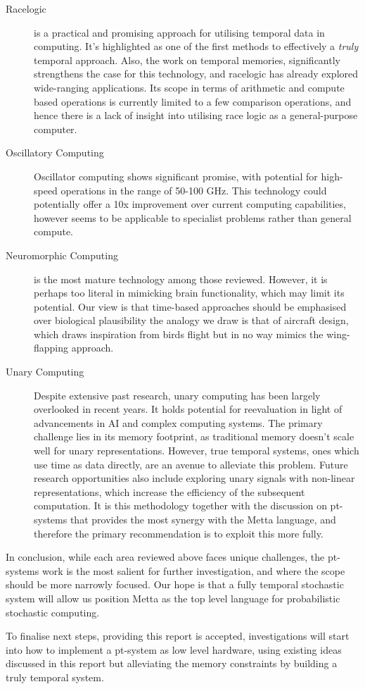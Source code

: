 \documentclass{article}
\begin{document}
\begin{description}

	\item[Racelogic] is a practical and promising approach for utilising temporal data in computing. It's highlighted as one of the first methods to effectively a \textit{truly} temporal approach. Also, the work on temporal memories, significantly strengthens the case for this technology, and racelogic has already explored wide-ranging applications. Its scope in terms of arithmetic and compute based operations is currently limited to a few comparison operations, and hence there is a lack of insight into utilising race logic as a general-purpose computer.


	\item[Oscillatory Computing] Oscillator computing shows significant promise, with potential for high-speed operations in the range of 50-100 GHz. This technology could potentially offer a 10x improvement over current computing capabilities, however seems to be applicable to specialist problems rather than general compute.

	\item[Neuromorphic Computing] is the most mature technology among those reviewed. However, it is perhaps too literal in mimicking brain functionality, which may limit its potential. Our view is that time-based approaches should be emphasised over biological plausibility the analogy we draw is that of aircraft design, which draws inspiration from birds flight but in no way mimics the wing-flapping approach.


	\item[Unary Computing] Despite extensive past research, unary computing has been largely overlooked in recent years. It holds potential for reevaluation in light of advancements in AI and complex computing systems. The primary challenge lies in its memory footprint, as traditional memory doesn't scale well for unary representations. However, true temporal systems, ones which use time as data directly, are an avenue to alleviate this problem. Future research opportunities also include exploring unary signals with non-linear representations, which increase the efficiency of the subsequent computation. It is this methodology together with the discussion on pt-systems that provides the most synergy with the Metta language, and therefore the primary recommendation is to exploit this more fully.
\end{description}

In conclusion, while each area reviewed above faces unique challenges, the pt-systems work is the most salient for further investigation, and where the scope should be more narrowly focused. Our hope is that a fully temporal stochastic system will allow us position Metta as the  top level language for probabilistic stochastic computing.  

To finalise next steps, providing this report is accepted, investigations will start into how to implement a pt-system as low level hardware, using existing ideas discussed in this report but alleviating the memory constraints by building a truly temporal system.  




\end{document}
